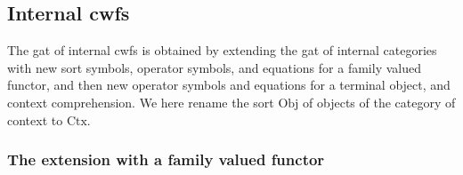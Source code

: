 \documentclass{lmcs}
\def\Obj{\mathrm{Obj}}
\def\Ctx{\mathrm{Ctx}}
\def\Hom{\mathrm{Hom}}
\def\id{\mathrm{id}}
\begin{document}

\subsection{Internal cwfs}

The gat of internal cwfs is obtained by extending the gat of internal categories with new sort symbols, operator symbols, and equations for a family valued functor, and then new operator symbols and equations for a terminal object, and context comprehension. We here rename the sort $\Obj$ of objects of the category of context to $\Ctx$.

\subsubsection{The extension with a family valued functor}
\mbox{ }
\end{document}
